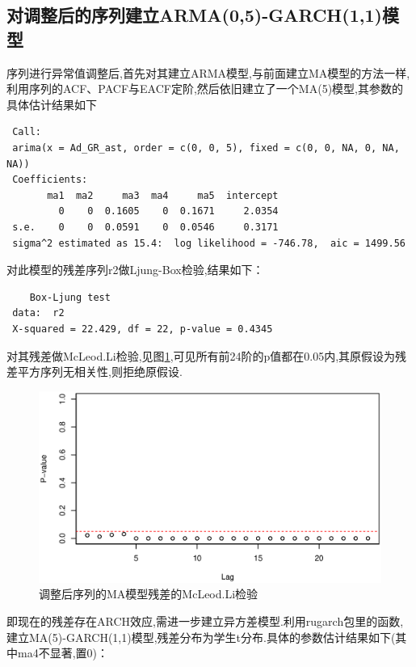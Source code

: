 \subsection{对调整后的序列建立ARMA(0,5)-GARCH(1,1)模型}
序列进行异常值调整后,首先对其建立ARMA模型,与前面建立MA模型的方法一样,利用序列的ACF、PACF与EACF定阶,然后依旧建立了一个MA(5)模型,其参数的具体估计结果如下
\begin{framed}
\begin{verbatim} 
 Call:
 arima(x = Ad_GR_ast, order = c(0, 0, 5), fixed = c(0, 0, NA, 0, NA, NA))
 Coefficients:
       ma1  ma2     ma3  ma4     ma5  intercept
         0    0  0.1605    0  0.1671     2.0354
 s.e.    0    0  0.0591    0  0.0546     0.3171
 sigma^2 estimated as 15.4:  log likelihood = -746.78,  aic = 1499.56
\end{verbatim}
\end{framed}
对此模型的残差序列r2做Ljung-Box检验,结果如下：
\begin{framed}
\begin{verbatim}
 	Box-Ljung test
 data:  r2
 X-squared = 22.429, df = 22, p-value = 0.4345
\end{verbatim}
\end{framed}
对其残差做McLeod.Li检验,见图\ref{fig:mcr2},可见所有前24阶的p值都在0.05内,其原假设为残差平方序列无相关性,则拒绝原假设.
\begin{figure}[h!]
	\centering
	\includegraphics[width=0.5\linewidth]{pic/ast/mcr2}
	\caption{调整后序列的MA模型残差的McLeod.Li检验}
	\label{fig:mcr2}
\end{figure}
即现在的残差存在ARCH效应,需进一步建立异方差模型.利用rugarch包里的函数,建立MA(5)-GARCH(1,1)模型,残差分布为学生t分布.具体的参数估计结果如下(其中ma4不显著,置0)：

